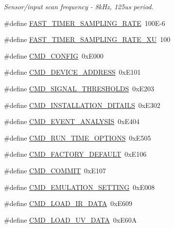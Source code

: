 \begin{DoxyCompactItemize}
\begin{DoxyCompactList}\small\item\em Sensor/input scan frequency -\/ 8k\+Hz, 125us period. \end{DoxyCompactList}\item 
\#define \hyperlink{a00086_a3a4dcb8af26a561d90607a41a3745806}{F\+A\+S\+T\+\_\+\+T\+I\+M\+E\+R\+\_\+\+S\+A\+M\+P\+L\+I\+N\+G\+\_\+\+R\+A\+T\+E}~100\+E-\/6
\item 
\#define \hyperlink{a00086_a87ea9a0eaa474d8b8f672cfa5cbb091f}{F\+A\+S\+T\+\_\+\+T\+I\+M\+E\+R\+\_\+\+S\+A\+M\+P\+L\+I\+N\+G\+\_\+\+R\+A\+T\+E\+\_\+\+X\+U}~100
\item 
\#define \hyperlink{a00086_aa87bfa4fccf7f7a4fc45afb1966a655f}{C\+M\+D\+\_\+\+C\+O\+N\+F\+I\+G}~0x\+E000
\item 
\#define \hyperlink{a00086_a7c6a5f4023cb02d02f2ded23147be425}{C\+M\+D\+\_\+\+D\+E\+V\+I\+C\+E\+\_\+\+A\+D\+D\+R\+E\+S\+S}~0x\+E101
\item 
\#define \hyperlink{a00086_ac361dc1b32c1036394be0fd7de1182ca}{C\+M\+D\+\_\+\+S\+I\+G\+N\+A\+L\+\_\+\+T\+H\+R\+E\+S\+H\+O\+L\+D\+S}~0x\+E203
\item 
\#define \hyperlink{a00086_af91ff280feea1f52e3bdd7f0f556d153}{C\+M\+D\+\_\+\+I\+N\+S\+T\+A\+L\+L\+A\+T\+I\+O\+N\+\_\+\+D\+I\+T\+A\+I\+L\+S}~0x\+E302
\item 
\#define \hyperlink{a00086_a3a15793e3ab7817f2429edf04de693a0}{C\+M\+D\+\_\+\+E\+V\+E\+N\+T\+\_\+\+A\+N\+A\+L\+Y\+S\+I\+S}~0x\+E404
\item 
\#define \hyperlink{a00086_a1d8673a7ca545f3e382fc538f543ab72}{C\+M\+D\+\_\+\+R\+U\+N\+\_\+\+T\+I\+M\+E\+\_\+\+O\+P\+T\+I\+O\+N\+S}~0x\+E505
\item 
\#define \hyperlink{a00086_a8ad7dae51114833acbb665d703d8ffeb}{C\+M\+D\+\_\+\+F\+A\+C\+T\+O\+R\+Y\+\_\+\+D\+E\+F\+A\+U\+L\+T}~0x\+E106
\item 
\#define \hyperlink{a00086_a7df85bf97a6a032220d7a71c78be5206}{C\+M\+D\+\_\+\+C\+O\+M\+M\+I\+T}~0x\+E107
\item 
\#define \hyperlink{a00086_a230386ac00f9c01793857101e1680324}{C\+M\+D\+\_\+\+E\+M\+U\+L\+A\+T\+I\+O\+N\+\_\+\+S\+E\+T\+T\+I\+N\+G}~0x\+E008
\item 
\#define \hyperlink{a00086_a8c7ce698ee79d20e30eb0ac08f0d9abc}{C\+M\+D\+\_\+\+L\+O\+A\+D\+\_\+\+I\+R\+\_\+\+D\+A\+T\+A}~0x\+E609
\item 
\#define \hyperlink{a00086_a8904f57ef5850374dbcdbe67eb8a5543}{C\+M\+D\+\_\+\+L\+O\+A\+D\+\_\+\+U\+V\+\_\+\+D\+A\+T\+A}~0x\+E60\+A
\item 

\end{DoxyCompactItemize}
